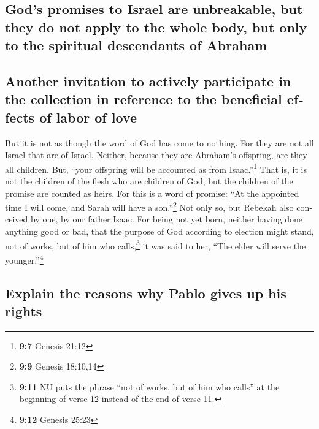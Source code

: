 \begin{paracol}{2}
\begin{otherlanguage}{english}
\hypertarget{gods-promises-to-israel-are-unbreakable-but-they-do-not-apply-to-the-whole-body-but-only-to-the-spiritual-descendants-of-abraham}{%
\subsection{God's promises to Israel are unbreakable, but they do not
apply to the whole body, but only to the spiritual descendants of
Abraham}\label{gods-promises-to-israel-are-unbreakable-but-they-do-not-apply-to-the-whole-body-but-only-to-the-spiritual-descendants-of-abraham}}

\hypertarget{another-invitation-to-actively-participate-in-the-collection-in-reference-to-the-beneficial-effects-of-labor-of-love}{%
\subsection{Another invitation to actively participate in the collection
in reference to the beneficial effects of labor of
love}\label{another-invitation-to-actively-participate-in-the-collection-in-reference-to-the-beneficial-effects-of-labor-of-love}}

 But it is not as though the word of God has come to
nothing. For they are not all Israel that are of Israel. 
Neither, because they are Abraham's offspring, are they all children.
But, ``your offspring will be accounted as from Isaac.''\footnote{\textbf{9:7}
  Genesis 21:12}  That is, it is not the children of the
flesh who are children of God, but the children of the promise are
counted as heirs.  For this is a word of promise: ``At the
appointed time I will come, and Sarah will have a son.''\footnote{\textbf{9:9}
  Genesis 18:10,14}  Not only so, but Rebekah also
conceived by one, by our father Isaac.  For being not yet
born, neither having done anything good or bad, that the purpose of God
according to election might stand, not of works, but of him who
calls,\footnote{\textbf{9:11} NU puts the phrase ``not of works, but of
  him who calls'' at the beginning of verse 12 instead of the end of
  verse 11.}  it was said to her, ``The elder will serve
the younger.''\footnote{\textbf{9:12} Genesis 25:23}

\hypertarget{explain-the-reasons-why-pablo-gives-up-his-rights}{%
\subsection{Explain the reasons why Pablo gives up his
rights}\label{explain-the-reasons-why-pablo-gives-up-his-rights}}


\end{otherlanguage}
\end{paracol}
